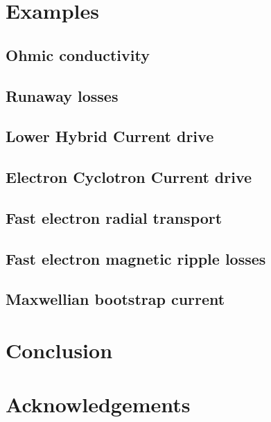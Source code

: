 \documentclass[11pt,a4paper]{report}
\begin{document}
\chapter{Examples}


	\section{Ohmic conductivity}
	

	\section{Runaway losses}
	

	\section{Lower Hybrid Current drive}
	

	\section{Electron Cyclotron Current drive}
	

	\section{Fast electron radial transport}
	

	\section{Fast electron magnetic ripple losses}
	

	\section{Maxwellian bootstrap current}
	

\chapter{Conclusion}


\chapter{Acknowledgements}


\appendix
\end{document}
